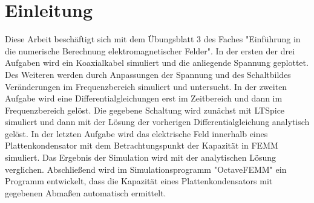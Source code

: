 \chapter{Einleitung}\label{sec:intro}
Diese Arbeit beschäftigt sich mit dem Übungsblatt 3 des Faches "Einführung in die numerische Berechnung
elektromagnetischer Felder". In der ersten der drei Aufgaben wird ein Koaxialkabel simuliert und die anliegende Spannung geplottet. Des Weiteren werden durch Anpassungen der Spannung und des Schaltbildes Veränderungen im Frequenzbereich simuliert und untersucht. 
In der zweiten Aufgabe wird eine Differentialgleichungen erst im Zeitbereich und dann im Frequenzbereich gelöst. Die gegebene Schaltung wird zunächst mit LTSpice simuliert und dann mit der Lösung der vorherigen Differentialgleichung analytisch gelöst.
In der letzten Aufgabe wird das elektrische Feld innerhalb eines Plattenkondensator mit dem Betrachtungspunkt der Kapazität in FEMM simuliert. Das Ergebnis der Simulation wird mit der analytischen Lösung verglichen. Abschließend wird im Simulationsprogramm "OctaveFEMM" ein Programm entwickelt, dass die Kapazität eines Plattenkondensators mit gegebenen Abmaßen automatisch ermittelt.